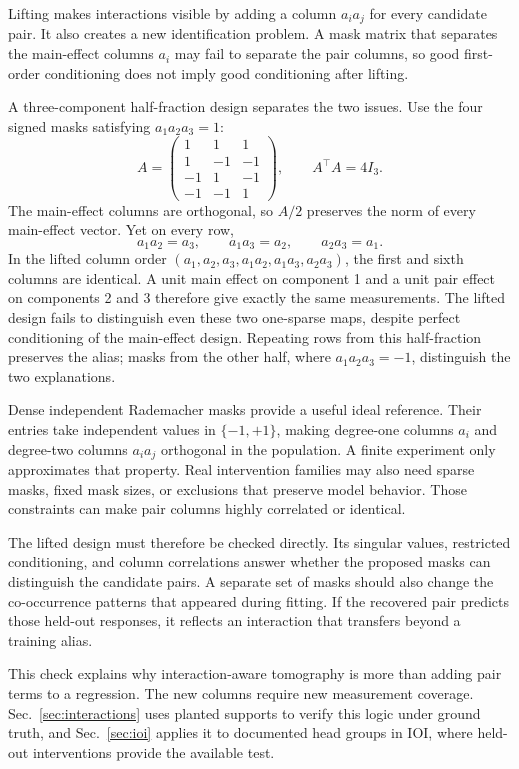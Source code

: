 \documentclass[sigconf,10pt,nonacm,balance=false]{acmart}
\begin{document}
Lifting makes interactions visible by adding a column $a_i a_j$ for every candidate pair. It also creates a new identification problem. A mask matrix that separates the main-effect columns $a_i$ may fail to separate the pair columns, so good first-order conditioning does not imply good conditioning after lifting.

A three-component half-fraction design separates the two issues. Use the four signed masks satisfying $a_1a_2a_3=1$:
\[
 A=\begin{pmatrix}
  1& 1& 1\\
  1&-1&-1\\
 -1& 1&-1\\
 -1&-1& 1
 \end{pmatrix},
 \qquad A^\top A=4I_3.
\]
The main-effect columns are orthogonal, so $A/2$ preserves the norm of every main-effect vector. Yet on every row,
\[
 a_1a_2=a_3,\qquad a_1a_3=a_2,\qquad a_2a_3=a_1.
\]
In the lifted column order $(a_1,a_2,a_3,a_1a_2,a_1a_3,a_2a_3)$, the first and sixth columns are identical. A unit main effect on component 1 and a unit pair effect on components 2 and 3 therefore give exactly the same measurements. The lifted design fails to distinguish even these two one-sparse maps, despite perfect conditioning of the main-effect design. Repeating rows from this half-fraction preserves the alias; masks from the other half, where $a_1a_2a_3=-1$, distinguish the two explanations.

Dense independent Rademacher masks provide a useful ideal reference. Their entries take independent values in $\{-1,+1\}$, making degree-one columns $a_i$ and degree-two columns $a_i a_j$ orthogonal in the population. A finite experiment only approximates that property. Real intervention families may also need sparse masks, fixed mask sizes, or exclusions that preserve model behavior. Those constraints can make pair columns highly correlated or identical.

The lifted design must therefore be checked directly. Its singular values, restricted conditioning, and column correlations answer whether the proposed masks can distinguish the candidate pairs. A separate set of masks should also change the co-occurrence patterns that appeared during fitting. If the recovered pair predicts those held-out responses, it reflects an interaction that transfers beyond a training alias.

This check explains why interaction-aware tomography is more than adding pair terms to a regression. The new columns require new measurement coverage. Sec.~\ref{sec:interactions} uses planted supports to verify this logic under ground truth, and Sec.~\ref{sec:ioi} applies it to documented head groups in IOI, where held-out interventions provide the available test.
\end{document}

